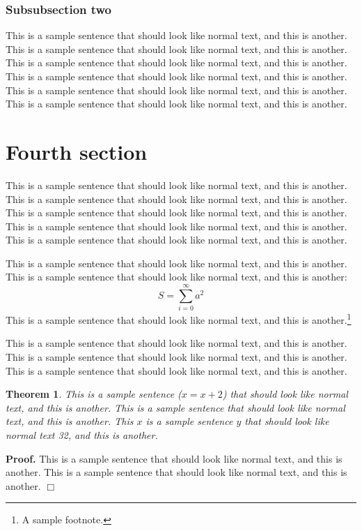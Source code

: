 \documentclass[officiallayout]{tktla}
\newtheorem{theorem}{Theorem}[chapter]
\newenvironment{proof}{\noindent\textbf{Proof.} }{$\Box$}
\begin{document}
\subsubsection{Subsubsection two}

This is a sample sentence that should look like normal text, and this
is another. This is a sample sentence that should look like normal
text, and this is another. This is a sample sentence that should look
like normal text, and this is another. This is a sample sentence that
should look like normal text, and this is another. This is a sample
sentence that should look like normal text, and this is another. This
is a sample sentence that should look like normal text, and this is
another.

\section{Fourth section}

This is a sample sentence that should look like normal text, and this
is another. This is a sample sentence that should look like normal
text, and this is another. This is a sample sentence that should look
like normal text, and this is another. This is a sample sentence that
should look like normal text, and this is another. This is a sample
sentence that should look like normal text, and this is another. 

This is a sample sentence that should look like normal text, and this
is another. This is a sample sentence that should look like normal
text, and this is another:
\[ S = \sum_{i=0}^{\infty} a^2 \]
This is a sample sentence that should look like normal text, and this
is another.\footnote{A sample footnote.}

This is a sample sentence that should look like normal text, and this
is another. This is a sample sentence that should look like normal
text, and this is another. This is a sample sentence that should look
like normal text, and this is another.

\begin{theorem}
This is a sample sentence ($x=x+2$) that should look like normal text,
and this is another. This is a sample sentence that should look like
normal text, and this is another. This $x$ is a sample sentence $y$
that should look like normal text 32, and this is another.
\end{theorem}

\begin{proof}
This is a sample sentence that should look like normal text, and this
is another. This is a sample sentence that should look like normal
text, and this is another.
\end{proof}
\end{document}
